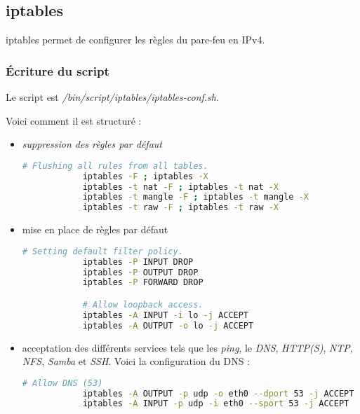 \subsection{iptables}
\label{subsec:iptables}

iptables permet de configurer les règles du pare-feu en IPv4.

\subsubsection{Écriture du script}
\label{subsubsec:ecriture-script}

Le script est \textit{/bin/script/iptables/iptables-conf.sh}.

Voici comment il est structuré :
\begin{itemize}
    \item \textit{suppression des règles par défaut}

        \begin{lstlisting}[language=bash]
            # Flushing all rules from all tables.
            iptables -F ; iptables -X
            iptables -t nat -F ; iptables -t nat -X
            iptables -t mangle -F ; iptables -t mangle -X
            iptables -t raw -F ; iptables -t raw -X
        \end{lstlisting}

    \item mise en place de règles par défaut

        \begin{lstlisting}[language=bash]
            # Setting default filter policy.
            iptables -P INPUT DROP
            iptables -P OUTPUT DROP
            iptables -P FORWARD DROP

            # Allow loopback access.
            iptables -A INPUT -i lo -j ACCEPT
            iptables -A OUTPUT -o lo -j ACCEPT
        \end{lstlisting}

    \item acceptation des différents services tels que les \emph{ping}, le
    \emph{DNS}, \emph{HTTP(S)}, \emph{NTP}, \emph{NFS}, \emph{Samba} et \emph{SSH}.
    Voici la configuration du DNS :

        \begin{lstlisting}[language=bash]
            # Allow DNS (53)
            iptables -A OUTPUT -p udp -o eth0 --dport 53 -j ACCEPT
            iptables -A INPUT -p udp -i eth0 --sport 53 -j ACCEPT
        \end{lstlisting}

\end{itemize}

